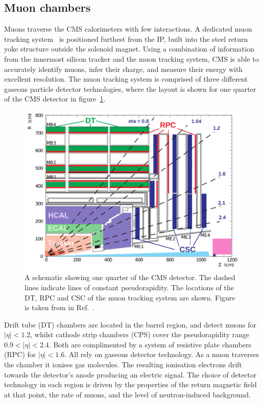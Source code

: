 \subsection{Muon chambers}\label{sec:cms_muon}
Muons traverse the CMS calorimeters with few interactions. A dedicated muon tracking system~\cite{Chatrchyan:2008zzk,Chatrchyan:2013sba} is positioned furthest from the IP, built into the steel return yoke structure outside the solenoid magnet. Using a combination of information from the innermost silicon tracker and the muon tracking system, CMS is able to accurately identify muons, infer their charge, and measure their energy with excellent resolution. The muon tracking system is comprised of three different gaseous particle detector technologies, where the layout is shown for one quarter of the CMS detector in figure~\ref{fig:cms_muon}. 

\begin{figure}[htb!]
  \centering
  \includegraphics[width=.6\textwidth]{Figures/cms/muon.pdf}
  \caption[The CMS hadronic calorimeter]
  {
    A schematic showing one quarter of the CMS detector. The dashed lines indicate lines of constant pseudorapidity. The locations of the DT, RPC and CSC of the muon tracking system are shown. Figure is taken from in Ref.~\cite{Chatrchyan:2012xi}.
  }
  \label{fig:cms_muon}
\end{figure}

Drift tube (DT) chambers are located in the barrel region, and detect muons for $|\eta|<1.2$, whilst cathode strip chambers (CPS) cover the pseudorapidity range $0.9<|\eta|<2.4$. Both are complimented by a system of resistive plate chambers (RPC) for $|\eta|<1.6$. All rely on gaseous detector technology. As a muon traverses the chamber it ionises gas molecules. The resulting ionisation electrons drift towards the detector's anode producing an electric signal. The choice of detector technology in each region is driven by the properties of the return magnetic field at that point, the rate of muons, and the level of neutron-induced background.

